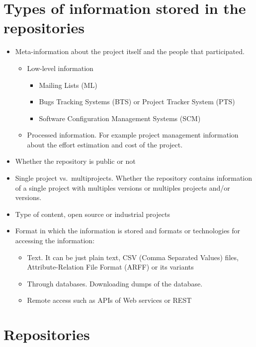 \documentclass[]{book}
\begin{document}
\section{Types of information stored in the
repositories}\label{types-of-information-stored-in-the-repositories}

\begin{itemize}
\item
  Meta-information about the project itself and the people that
  participated.

  \begin{itemize}
  \item
    Low-level information

    \begin{itemize}
    \item
      Mailing Lists (ML)
    \item
      Bugs Tracking Systems (BTS) or Project Tracker System (PTS)
    \item
      Software Configuration Management Systems (SCM)
    \end{itemize}
  \item
    Processed information. For example project management information
    about the effort estimation and cost of the project.
  \end{itemize}
\item
  Whether the repository is public or not
\item
  Single project vs.~multiprojects. Whether the repository contains
  information of a single project with multiples versions or multiples
  projects and/or versions.
\item
  Type of content, open source or industrial projects
\item
  Format in which the information is stored and formats or technologies
  for accessing the information:

  \begin{itemize}
  \item
    Text. It can be just plain text, CSV (Comma Separated Values) files,
    Attribute-Relation File Format (ARFF) or its variants
  \item
    Through databases. Downloading dumps of the database.
  \item
    Remote access such as APIs of Web services or REST
  \end{itemize}
\end{itemize}

\section{Repositories}\label{repositories}
\end{document}
